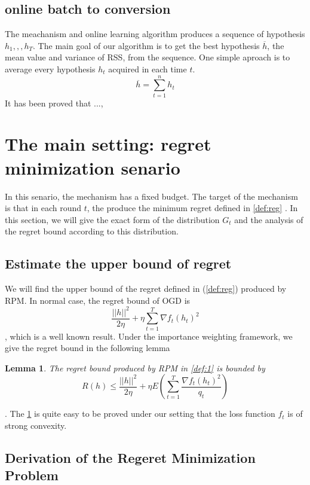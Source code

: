 \documentclass[10pt,conference,compsocconf,letterpaper]{IEEEtran}
\newtheorem{Lemma}{Lemma}
\begin{document}
\subsection{online batch to conversion}
The meachanism and online learning algorithm produces a sequence of hypothesis $h_1,,,h_T$. The main goal of our algorithm is to get the best hypothesis $\overline{h}$, the mean value and variance of RSS, from the sequence. One simple aproach is to average every hypothesis $h_t$ acquired in each time $t$.
\begin{equation}
\overline{h}=\sum_{t=1}^n h_t
\end{equation}
It has been proved that ...,

\section{The main setting: regret minimization senario}\label{mainsolution}
In this senario, the mechanism has a fixed budget. The target of the mechanism is that in each round $t$, the  produce the minimum regret defined in \ref{def:reg} . In this section, we will give the exact form of the distribution $G_t$ and the analysis of the regret bound according to this distribution. 
\subsection{Estimate the upper bound of regret}
We will find the upper bound of the regret defined in (\ref{def:reg}) produced by RPM. In normal case, the regret bound of OGD is 
\begin{equation}
\frac{||h||^2}{2\eta}+\eta \sum_{t=1}^T\nabla f_t(h_t)^2
\end{equation}
, which is a well known result. Under the importance weighting framework, we give the regret bound in the following lemma
\begin{Lemma}\label{lemma:reg}
The regret bound produced by RPM in \ref{def:1} is bounded by
\begin{equation}
R(h)\leq \frac{||h||^2}{2\eta}+\eta E(\sum_{t=1}^T\frac{\nabla f_t(h_t)^2}{q_t})
\end{equation}
\end{Lemma}
. The \ref{lemma:reg} is quite easy to be proved under our setting that the loss function $f_t$ is of strong convexity.

\subsection{Derivation of the Regeret Minimization Problem}
\end{document}

